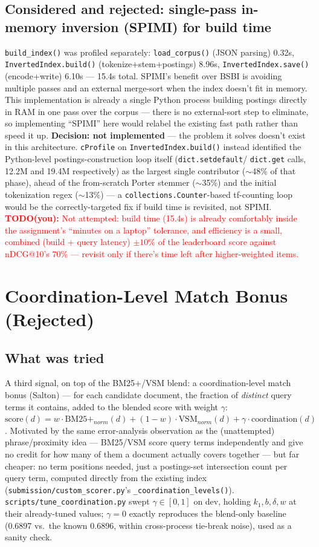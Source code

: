 \documentclass[11pt]{article}
\newcommand{\todo}[1]{\textcolor{red}{\textbf{TODO(you):} #1}}
\begin{document}
\subsection{Considered and rejected: single-pass in-memory inversion (SPIMI) for build time}
\texttt{build\_index()} was profiled separately: \texttt{load\_corpus()}
(JSON parsing) 0.32s, \texttt{InvertedIndex.build()}
(tokenize+stem+postings) 8.96s, \texttt{InvertedIndex.save()}
(encode+write) 6.10s --- 15.4s total. SPIMI's benefit over BSBI is
avoiding multiple passes and an external merge-sort when the index
doesn't fit in memory. This implementation is already a single Python
process building postings directly in RAM in one pass over the corpus
--- there is no external-sort step to eliminate, so implementing
``SPIMI'' here would relabel the existing fast path rather than speed it
up. \textbf{Decision: not implemented} --- the problem it solves doesn't
exist in this architecture. \texttt{cProfile} on
\texttt{InvertedIndex.build()} instead identified the Python-level
postings-construction loop itself (\texttt{dict.setdefault}/
\texttt{dict.get} calls, 12.2M and 19.4M respectively) as the largest
single contributor ($\sim$48\% of that phase), ahead of the from-scratch
Porter stemmer ($\sim$35\%) and the initial tokenization regex
($\sim$13\%) --- a \texttt{collections.Counter}-based tf-counting loop
would be the correctly-targeted fix if build time is revisited, not
SPIMI. \todo{Not attempted: build time (15.4s) is already comfortably
inside the assignment's ``minutes on a laptop'' tolerance, and efficiency
is a small, combined (build + query latency) $\pm10\%$ of the leaderboard
score against nDCG@10's 70\% --- revisit only if there's time left after
higher-weighted items.}

\section{Coordination-Level Match Bonus (Rejected)}

\subsection{What was tried}
A third signal, on top of the BM25+/VSM blend: a coordination-level
match bonus (Salton) --- for each candidate document, the fraction of
\emph{distinct} query terms it contains, added to the blended score with
weight $\gamma$:
$\text{score}(d) = w\cdot\text{BM25+}_{norm}(d) + (1-w)\cdot\text{VSM}_{norm}(d)
+ \gamma \cdot \text{coordination}(d)$. Motivated by the same error-analysis
observation as the (unattempted) phrase/proximity idea --- BM25/VSM score
query terms independently and give no credit for how many of them a
document actually covers together --- but far cheaper: no term
positions needed, just a postings-set intersection count per query term,
computed directly from the existing index (\texttt{submission/custom\_scorer.py}'s
\texttt{\_coordination\_levels()}). \texttt{scripts/tune\_coordination.py}
swept $\gamma \in [0, 1]$ on dev, holding $k_1,b,\delta,w$ at their
already-tuned values; $\gamma{=}0$ exactly reproduces the blend-only
baseline (0.6897 vs.\ the known 0.6896, within cross-process tie-break
noise), used as a sanity check.
\end{document}
